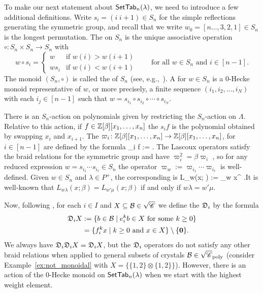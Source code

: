 \documentclass[11pt]{article}
\begin{document}
To make our next statement about $\mathsf{SetTab}_n(\lambda)$, we need to introduce a few additional definitions.
Write $s_i=(i\; i+1) \in S_n$ for the simple reflections generating the symmetric group, and recall that we write $w_0 =[n\dots,3,2,1]\in S_n$ is the longest permutation.
The  on $S_n$ is the unique associative operation $\circ \colon S_n \times S_n \to S_n$ with
\[
w \circ s_i = \begin{cases} w & \text{if } w(i) > w(i+1) \\ w s_i & \text{if }w(i) < w(i+1) \end{cases}
\qquad\text{for all $w \in S_n$ and $i \in [n-1]$.}
\]
The monoid $(S_n, \circ)$ is called the  of $S_n$ (see, e.g.,~\cite[\S29.3 Lemma A]{Humphreys75}).
A  for $w \in S_n$ is a $0$-Hecke monoid representative of $w$, or more precisely, a finite sequence $(i_1, i_2, \dotsc, i_N)$ with each $i_j \in [n-1]$ such that $w = s_{i_1} \circ s_{i_2} \circ \cdots \circ s_{i_N}$.



There is an $S_n$-action on polynomials given by restricting the $S_n$-action on $\Lambda$.
Relative to this action, if  $f \in \mathbb{Z}[\beta][x_1,\dotsc,x_n]$ the $s_i f$ is the polynomial obtained by swapping $x_i$ and $x_{i+1}$.
The  $\varpi_i \colon \mathbb{Z}[\beta][x_1,\dotsc,x_n]\to \mathbb{Z}[\beta][x_1,\dotsc,x_n]$, 
for $i \in [n-1]$ are defined by the formula
\be\label{eq:lascoux_ops}
\varpi_i f := .
\ee
The Lascoux operators satisfy the braid relations for the symmetric group and have $\varpi_i^2 = \beta \varpi_i$
\cite[Thm.~5.1]{Monical16},
 so for any reduced expression $w = s_{i_1} \cdots s_{i_{\ell}} \in S_n$ the operator $\varpi_w := \varpi_{i_1} \cdots \varpi_{i_{\ell}}$ is well-defined.
%
Given $w \in S_n$ and $\lambda \in P^+$, the corresponding  is 
\be  L_{w\lambda}(x; \beta) := \varpi_w x^{\lambda} \in   \ZZ[\beta][x_1,\dotsc,x_n].\ee It is well-known 
that $L_{w\lambda}(x; \beta) = L_{w'\mu}(x;\beta)$ if and only if $w \lambda = w' \mu$.

Now, following \cite[\S13.2]{BumpSchilling}, for each $i \in I$ and $X \subseteq \mathcal{B} \in \sqrt{\mathscr{C}}$ we define the  $\mathfrak{D}_i$ by the formula
\begin{subequations}
\begin{align}
\mathfrak{D}_i X & := \{ b \in \mathcal{B} \mid e_i^k b\in X\text{ for some }k \geq 0\}
\\ & = \{ f_i^k x \mid k\geq 0 \text{ and } x \in X\} \setminus\{\boldsymbol{0}\}.
\end{align}
\end{subequations}
We always have $\mathfrak{D}_i \mathfrak{D}_i X = \mathfrak{D}_i X$, but the
$\mathfrak{D}_i$ operators do not  satisfy any other braid relations 
when applied to general subsets of crystals $\mathcal{B} \in \sqrt{\mathscr{C}}_{\operatorname{poly}}$ (consider Example~\ref{ex:not_monoidal} with $X = \{ \{1,2\} \otimes \{1,2\}\}$).
However, there is an action of the $0$-Hecke monoid on $\mathsf{SetTab}_n(\lambda)$ when we start with the highest weight element.
\end{document}
